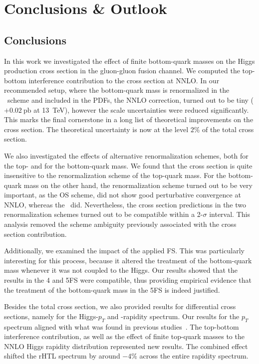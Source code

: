 

\chapter{Conclusions \& Outlook}\label{chap:seven}
\section{Conclusions}
In this work we investigated the effect of finite bottom-quark masses on the Higgs production cross section in the gluon-gluon fusion channel. We computed the top-bottom interference contribution to the cross section at \acs{NNLO}. In our recommended setup, where the bottom-quark mass is renormalized in the \MS\ scheme and included in the \acs{PDF}s, the \acs{NNLO} correction, turned out to be tiny ($+0.02\ \mathrm{pb}$ at 13~TeV), however the scale uncertainties were reduced significantly. This marks the final cornerstone in a long list of theoretical improvements on the cross section. The theoretical uncertainty is now at the level $2\%$ of the total cross section.

We also investigated the effects of alternative renormalization schemes, both for the top- and for the bottom-quark mass. We found that the cross section is quite insensitive to the renormalization scheme of the top-quark mass. For the bottom-quark mass on the other hand, the renormalization scheme turned out to be very important, as the \acs{OS} scheme, did not show good perturbative convergence at \acs{NNLO}, whereas the \MS\ did. Nevertheless, the cross section predictions in the two renormalization schemes turned out to be compatible within a 2-$\sigma$ interval. This analysis removed the scheme ambiguity previously associated with the cross section contribution.

Additionally, we examined the impact of the applied \acs{FS}. This was particularly interesting for this process, because it altered the treatment of the bottom-quark mass whenever it was not coupled to the Higgs. Our results showed that the results in the 4 and 5\acs{FS} were compatible, thus providing empirical evidence that the treatment of the bottom-quark mass in the 5\acs{FS} is indeed justified.

Besides the total cross section, we also provided results for differential cross sections, namely for the Higgs-$p_T$ and -rapidity spectrum. Our results for the $p_T$ spectrum aligned with what was found in previous studies~\cite{Caola:2018zye,Bonciani:2022jmb}. The top-bottom interference contribution, as well as the effect of finite top-quark masses to the \acs{NNLO} Higgs rapidity distribution represented new results. The combined effect shifted the \acs{rHTL} spectrum by around $-4\%$ across the entire rapidity spectrum.

